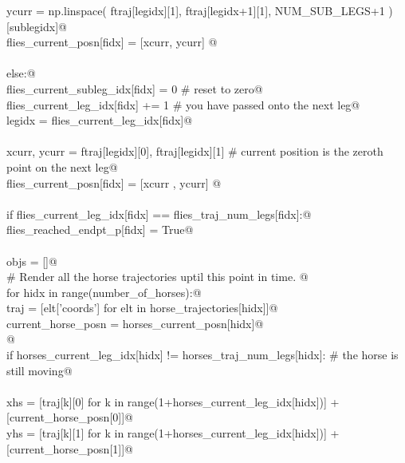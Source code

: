\documentclass[12.0pt]{report}
\begin{document}
\begin{appendices}
\begin{flushleft}
\begin{list}{}{}
\mbox{}\verb@                    ycurr = np.linspace( ftraj[legidx][1], ftraj[legidx+1][1], NUM_SUB_LEGS+1 )[sublegidx]@\\
\mbox{}\verb@                    flies_current_posn[fidx]  = [xcurr, ycurr] @\\
\mbox{}\verb@@\\
\mbox{}\verb@                else:@\\
\mbox{}\verb@                    flies_current_subleg_idx[fidx] = 0 # reset to zero@\\
\mbox{}\verb@                    flies_current_leg_idx[fidx]   += 1 # you have passed onto the next leg@\\
\mbox{}\verb@                    legidx    = flies_current_leg_idx[fidx]@\\
\mbox{}\verb@@\\
\mbox{}\verb@                    xcurr, ycurr = ftraj[legidx][0], ftraj[legidx][1] # current position is the zeroth point on the next leg@\\
\mbox{}\verb@                    flies_current_posn[fidx]  = [xcurr , ycurr] @\\
\mbox{}\verb@@\\
\mbox{}\verb@                    if flies_current_leg_idx[fidx] == flies_traj_num_legs[fidx]:@\\
\mbox{}\verb@                        flies_reached_endpt_p[fidx] = True@\\
\mbox{}\verb@@\\
\mbox{}\verb@        objs = []@\\
\mbox{}\verb@        # Render all the horse trajectories uptil this point in time. @\\
\mbox{}\verb@        for hidx in range(number_of_horses):@\\
\mbox{}\verb@            traj               = [elt['coords'] for elt in horse_trajectories[hidx]]@\\
\mbox{}\verb@            current_horse_posn = horses_current_posn[hidx]@\\
\mbox{}\verb@            @\\
\mbox{}\verb@            if horses_current_leg_idx[hidx] != horses_traj_num_legs[hidx]: # the horse is still moving@\\
\mbox{}\verb@@\\
\mbox{}\verb@                  xhs = [traj[k][0] for k in range(1+horses_current_leg_idx[hidx])] + [current_horse_posn[0]]@\\
\mbox{}\verb@                  yhs = [traj[k][1] for k in range(1+horses_current_leg_idx[hidx])] + [current_horse_posn[1]]@\\

\end{list}
\end{flushleft}
\end{appendices}
\end{document}
